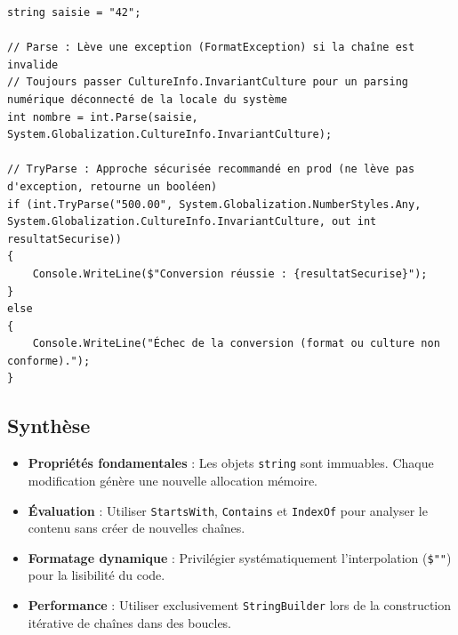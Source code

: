 \begin{lstlisting}[style=csharpstyle]
string saisie = "42";

// Parse : Lève une exception (FormatException) si la chaîne est invalide
// Toujours passer CultureInfo.InvariantCulture pour un parsing numérique déconnecté de la locale du système
int nombre = int.Parse(saisie, System.Globalization.CultureInfo.InvariantCulture);

// TryParse : Approche sécurisée recommandé en prod (ne lève pas d'exception, retourne un booléen)
if (int.TryParse("500.00", System.Globalization.NumberStyles.Any, System.Globalization.CultureInfo.InvariantCulture, out int resultatSecurise))
{
    Console.WriteLine($"Conversion réussie : {resultatSecurise}");
}
else
{
    Console.WriteLine("Échec de la conversion (format ou culture non conforme).");
}
\end{lstlisting}

\subsection{Synthèse}
\begin{itemize}
    \item \textbf{Propriétés fondamentales} : Les objets \texttt{string} sont immuables. Chaque modification génère une nouvelle allocation mémoire.
    \item \textbf{Évaluation} : Utiliser \texttt{StartsWith}, \texttt{Contains} et \texttt{IndexOf} pour analyser le contenu sans créer de nouvelles chaînes.
    \item \textbf{Formatage dynamique} : Privilégier systématiquement l'interpolation (\texttt{\$""}) pour la lisibilité du code.
    \item \textbf{Performance} : Utiliser exclusivement \texttt{StringBuilder} lors de la construction itérative de chaînes dans des boucles.
\end{itemize}
